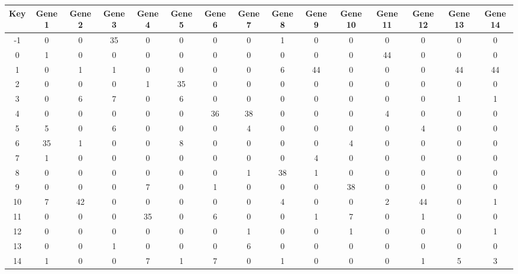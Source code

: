 \begin{tabular}{|c|c|c|c|c|c|c|c|c|c|c|c|c|c|c|}
\hline
Key & Gene 1 & Gene 2 & Gene 3 & Gene 4 & Gene 5 & Gene 6 & Gene 7 & Gene 8 & Gene 9 & Gene 10 & Gene 11 & Gene 12 & Gene 13 & Gene 14 \\
\hline
-1 & 0 & 0 & 35 & 0 & 0 & 0 & 0 & 1 & 0 & 0 & 0 & 0 & 0 & 0 \\
0 & 1 & 0 & 0 & 0 & 0 & 0 & 0 & 0 & 0 & 0 & 44 & 0 & 0 & 0 \\
1 & 0 & 1 & 1 & 0 & 0 & 0 & 0 & 6 & 44 & 0 & 0 & 0 & 44 & 44 \\
2 & 0 & 0 & 0 & 1 & 35 & 0 & 0 & 0 & 0 & 0 & 0 & 0 & 0 & 0 \\
3 & 0 & 6 & 7 & 0 & 6 & 0 & 0 & 0 & 0 & 0 & 0 & 0 & 1 & 1 \\
4 & 0 & 0 & 0 & 0 & 0 & 36 & 38 & 0 & 0 & 0 & 4 & 0 & 0 & 0 \\
5 & 5 & 0 & 6 & 0 & 0 & 0 & 4 & 0 & 0 & 0 & 0 & 4 & 0 & 0 \\
6 & 35 & 1 & 0 & 0 & 8 & 0 & 0 & 0 & 0 & 4 & 0 & 0 & 0 & 0 \\
7 & 1 & 0 & 0 & 0 & 0 & 0 & 0 & 0 & 4 & 0 & 0 & 0 & 0 & 0 \\
8 & 0 & 0 & 0 & 0 & 0 & 0 & 1 & 38 & 1 & 0 & 0 & 0 & 0 & 0 \\
9 & 0 & 0 & 0 & 7 & 0 & 1 & 0 & 0 & 0 & 38 & 0 & 0 & 0 & 0 \\
10 & 7 & 42 & 0 & 0 & 0 & 0 & 0 & 4 & 0 & 0 & 2 & 44 & 0 & 1 \\
11 & 0 & 0 & 0 & 35 & 0 & 6 & 0 & 0 & 1 & 7 & 0 & 1 & 0 & 0 \\
12 & 0 & 0 & 0 & 0 & 0 & 0 & 1 & 0 & 0 & 1 & 0 & 0 & 0 & 1 \\
13 & 0 & 0 & 1 & 0 & 0 & 0 & 6 & 0 & 0 & 0 & 0 & 0 & 0 & 0 \\
14 & 1 & 0 & 0 & 7 & 1 & 7 & 0 & 1 & 0 & 0 & 0 & 1 & 5 & 3 \\
\hline
\end{tabular}